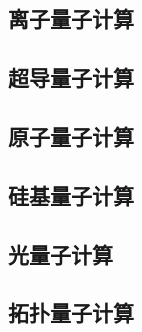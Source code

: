 \subsection[离子量子计算]{离子量子计算}

\subsection[超导量子计算]{超导量子计算}

\subsection[原子量子计算]{原子量子计算}

\subsection[硅基量子计算]{硅基量子计算}

\subsection[光量子计算]{光量子计算}

\subsection[拓扑量子计算]{拓扑量子计算}






